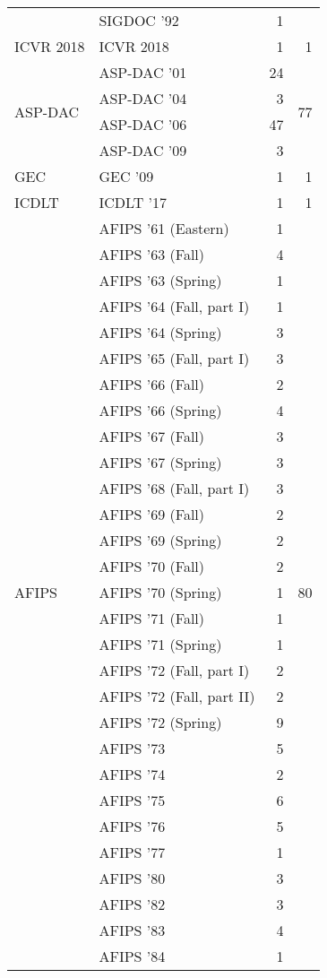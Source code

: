 \begin{table*}[t]
\begin{tabular}{llrr}
& SIGDOC '92 & 1 &\\
\multirow{1}{*}{ICVR 2018} & ICVR 2018 & 1 & \multirow{1}{*}{1}\\
\multirow{4}{*}{ASP-DAC } & ASP-DAC '01 & 24 & \multirow{4}{*}{77}\\
& ASP-DAC '04 & 3 &\\
& ASP-DAC '06 & 47 &\\
& ASP-DAC '09 & 3 &\\
\multirow{1}{*}{GEC } & GEC '09 & 1 & \multirow{1}{*}{1}\\
\multirow{1}{*}{ICDLT } & ICDLT '17 & 1 & \multirow{1}{*}{1}\\
\multirow{29}{*}{AFIPS } & AFIPS '61 (Eastern) & 1 & \multirow{29}{*}{80}\\
& AFIPS '63 (Fall) & 4 &\\
& AFIPS '63 (Spring) & 1 &\\
& AFIPS '64 (Fall, part I) & 1 &\\
& AFIPS '64 (Spring) & 3 &\\
& AFIPS '65 (Fall, part I) & 3 &\\
& AFIPS '66 (Fall) & 2 &\\
& AFIPS '66 (Spring) & 4 &\\
& AFIPS '67 (Fall) & 3 &\\
& AFIPS '67 (Spring) & 3 &\\
& AFIPS '68 (Fall, part I) & 3 &\\
& AFIPS '69 (Fall) & 2 &\\
& AFIPS '69 (Spring) & 2 &\\
& AFIPS '70 (Fall) & 2 &\\
& AFIPS '70 (Spring) & 1 &\\
& AFIPS '71 (Fall) & 1 &\\
& AFIPS '71 (Spring) & 1 &\\
& AFIPS '72 (Fall, part I) & 2 &\\
& AFIPS '72 (Fall, part II) & 2 &\\
& AFIPS '72 (Spring) & 9 &\\
& AFIPS '73 & 5 &\\
& AFIPS '74 & 2 &\\
& AFIPS '75 & 6 &\\
& AFIPS '76 & 5 &\\
& AFIPS '77 & 1 &\\
& AFIPS '80 & 3 &\\
& AFIPS '82 & 3 &\\
& AFIPS '83 & 4 &\\
& AFIPS '84 & 1 &\\

\end{tabular}
\end{table*}
